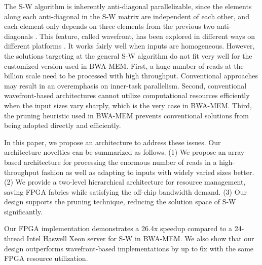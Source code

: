 The S-W algorithm is inherently anti-diagonal parallelizable, since the elements along each anti-diagonal in the S-W matrix are independent of each other, and each element only depends on three elements from the previous two anti-diagonals \cite{Edmiston1988}. 
This feature, called wavefront, has been explored in different ways on different platforms \cite{Preusser2012}\cite{RaceLogic}\cite{Zhang2007}\cite{Kim2011}\cite{Lam2013}. 
It works fairly well when inputs are homogeneous. 
However, the solutions targeting at the general S-W algorithm do not fit very well for the customized version used in BWA-MEM. 
First, a huge number of reads at the billion scale need to be processed with high throughput. 
Conventional approaches may result in an overemphasis on inner-task parallelism. 
Second, conventional wavefront-based architectures cannot utilize computational resources efficiently when the input sizes vary sharply, which is the very case in BWA-MEM. 
Third, the pruning heuristic used in BWA-MEM prevents conventional solutions from being adopted directly and efficiently.

In this paper, we propose an architecture to address these issues.
Our architecture novelties can be summarized as follows. 
(1) We propose an array-based architecture for processing the enormous number of reads in a high-throughput fashion as well as adapting to inputs with widely varied sizes better. 
(2) We provide a two-level hierarchical architecture for resource management, saving FPGA fabrics while satisfying the off-chip bandwidth demand.
(3) Our design supports the pruning technique, reducing the solution space of S-W significantly. 

Our FPGA implementation demonstrates a 26.4x speedup compared to a 24-thread Intel Haswell Xeon server for S-W in BWA-MEM. 
We also show that our design outperforms wavefront-based implementations by up to 6x with the same FPGA resource utilization.

